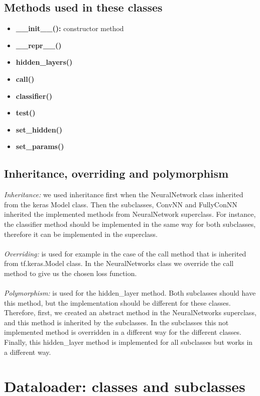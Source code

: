 \documentclass[11pt]{article}
\begin{document}
\subsection{Methods used in these classes}
\begin{itemize}
\item \textbf{\_\_init\_\_():}  constructor method
\item \textbf{\_\_repr\_\_()}
\item \textbf{hidden\_layers()}
\item \textbf{call()}
\item \textbf{classifier()}
\item \textbf{test()}
\item \textbf{set\_hidden()}
\item \textbf{set\_params()}
\end{itemize}

\subsection{Inheritance, overriding and polymorphism}
\emph{Inheritance:} we used inheritance first when the NeuralNetwork class inherited from the keras Model class. Then the subclasses, ConvNN and FullyConNN inherited the implemented methods from NeuralNetwork superclass. For instance, the classifier method should be implemented in the same way for both subclasses, therefore it can be implemented in the superclass.
\\
\\
\emph{Overriding:}  is used for example in the case of the call method that is inherited from tf.keras.Model class. In the NeuralNetworks class we override the call method to give us the chosen loss function.
\\
\\
\emph{Polymorphism:}  is used for the hidden\_layer method. Both subclasses should have this method, but the implementation should be different for these classes. Therefore, first, we created an abstract method in the NeuralNetworks superclass, and this method is inherited by the subclasses. In the subclasses this not implemented method is overridden in a different way for the different classes. Finally, this hidden\_layer method is implemented for all subclasses but works in a different way.


\section{Dataloader: classes and subclasses}
\end{document}
